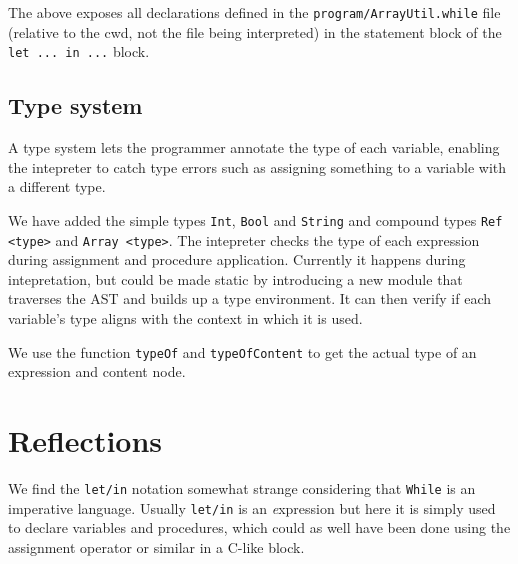 \documentclass{article}
\begin{document}
The above exposes all declarations defined in the {\tt program/ArrayUtil.while} file (relative to the cwd, not the file being interpreted) in the statement block of the {\tt let ... in ...} block.

\subsection{Type system}
\label{sec:type}
A type system lets the programmer annotate the type of each variable,
enabling the intepreter to catch type errors such as assigning
something to a variable with a different type.

We have added the simple types {\tt Int}, {\tt Bool} and {\tt String}
and compound types {\tt Ref <type>} and {\tt Array <type>}. The
intepreter checks the type of each expression during assignment and
procedure application. Currently it happens during intepretation, but
could be made static by introducing a new module that traverses the
AST and builds up a type environment. It can then verify if each
variable's type aligns with the context in which it is used.

We use the function {\tt typeOf} and {\tt typeOfContent} to get the
actual type of an expression and content node.

\section{Reflections}
We find the {\tt let/in} notation somewhat strange considering that {\tt While} is an imperative language. Usually {\tt let/in} is an {\textit expression} but here it is simply used to declare variables and procedures, which could as well have been done using the assignment operator or similar in a C-like block.
\end{document}
